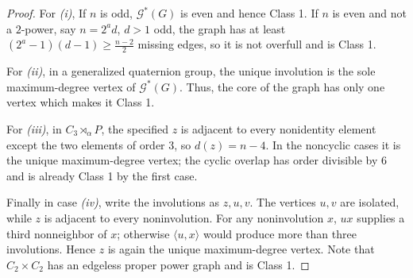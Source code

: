 \documentclass{article}
\theoremstyle{definition}
\theoremstyle{indentclaim}
\theoremstyle{named}
\theoremstyle{named}
\begin{document}
\begin{proof}
For \textit{(i)}, If \(n\) is odd, $\mathscr{G}^*(G)$ is even and hence Class 1. If $n$ is even and not a $2$-power, say \(n=2^a d\), \(d>1\) odd, the graph has at least
$(2^a-1)(d-1)\ge \frac{n-2}{2}$ missing edges, so it is not overfull and is Class 1. 

\noindent For \textit{(ii)}, in a generalized quaternion group, the unique involution is the sole maximum-degree vertex of \(\mathscr G^*(G)\). Thus, the core of the graph has only one vertex which makes it Class 1. 

\noindent For \textit{(iii)}, in \(C_3\rtimes_\alpha P\), the specified \(z\) is adjacent to every nonidentity element except the two elements of order \(3\), so
$d(z)=n-4$. In the noncyclic cases it is the unique maximum-degree vertex; the cyclic overlap has order divisible by \(6\) and is already Class 1 by the first case.

\noindent Finally in case \textit{(iv)}, write the involutions as \(z,u,v\). The vertices \(u,v\) are isolated, while \(z\) is adjacent to every noninvolution. For any noninvolution \(x\), \(ux\) supplies a third nonneighbor of \(x\); otherwise \(\langle u,x\rangle\) would produce more than three involutions. Hence \(z\) is again the unique maximum-degree vertex. Note that \(C_2\times C_2\) has an edgeless proper power graph and is Class 1.

\end{proof}



\bigskip
\end{document}
